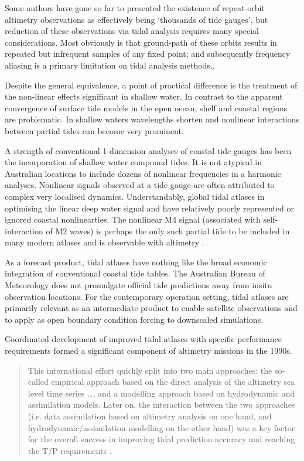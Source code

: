 Some authors have gone so far to presented the existence of repeat-orbit altimetry observations as effectively being `thousands of tide gauges', but reduction of these observations via tidal analysis requires many special considerations. Most obviously is that ground-path of these orbits results in repeated but infrequent samples of any fixed point; and subsequently frequency aliasing is a primary limitation on tidal analysis methods..



Despite the general equivalence, a point of practical difference is the treatment of the non-linear effects significant in shallow water.
In contrast to the apparent convergence of surface tide models in the open ocean, shelf and coastal regions are problematic.   In shallow waters wavelengths shorten and nonlinear interactions between partial tides can become very prominent. 


A strength of conventional 1-dimension analyses of coastal tide gauges has been the incorporation of shallow water compound tides.  It is not atypical in Australian locations to include dozens of nonlinear frequencies in a harmonic analyses.   Nonlinear signals observed at a tide gauge are often attributed to complex very localised dynamics.  
Understandably, global tidal atlases in optimising the linear deep water signal and have relatively poorly represented or ignored coastal nonlinearties.  The nonlinear M4 signal (associated with self-interaction of M2 waves) is perhaps the only such partial tide to be included in many modern atlases and is observable with altimetry \cite{Ray:2010jm}.


As a forecast product, tidal atlases have nothing like the broad economic integration of conventional coastal tide tables.  The Australian Bureau of Meteorology does not promulgate official tide predictions away from insitu observation locations. 
For the contemporary operation setting, tidal atlases are primarily relevant as an intermediate product to enable satellite observations and to apply as open boundary condition forcing to downscaled simulations.


Coordinated development of improved tidal atlases with specific performance requirements formed a significant component of altimetry missions in the 1990s.
\begin{quotation}
This international effort quickly split into two main approaches: the so-called empirical approach based on the direct analysis of the altimetry sea level time series \dots{}, and a modelling approach based on hydrodynamic and assimilation models. Later on, the interaction between the two approaches (i.e. data assimilation based on altimetry analysis on one hand, and hydrodynamic/assimilation modelling on the other hand) was a key factor for the overall success in improving tidal prediction accuracy and reaching the T/P requirements \cite[pp394]{Lefevre:2011dg}.
\end{quotation}

